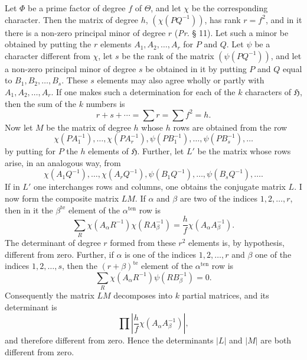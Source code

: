 \documentclass[11pt]{article}
\newcommand{\Hgrp}{\mathfrak{H}}
\newcommand{\ten}{\mathrm{ten}}
\newcommand{\te}{\mathrm{te}}
\begin{document}
Let $\Phi$ be a prime factor of degree $f$ of $\Theta$, and let $\chi$ be the corresponding character. Then the matrix of degree $h$, $(\chi(PQ^{-1}))$, has rank $r=f^2$, and in it there is a non-zero principal minor of degree $r$ (\emph{Pr.} § 11). Let such a minor be obtained by putting the $r$ elements $A_1,A_2,\ldots,A_r$ for $P$ and $Q$. Let $\psi$ be a character different from $\chi$, let $s$ be the rank of the matrix $(\psi(PQ^{-1}))$, and let a non-zero principal minor of degree $s$ be obtained in it by putting $P$ and $Q$ equal to $B_1,B_2,\ldots,B_s$. These $s$ elements may also agree wholly or partly with $A_1,A_2,\ldots,A_r$. If one makes such a determination for each of the $k$ characters of $\Hgrp$, then the sum of the $k$ numbers is
\[
r+s+\cdots=\sum r=\sum f^2=h.
\]
Now let $M$ be the matrix of degree $h$ whose $h$ rows are obtained from the row
\[
\chi(PA_1^{-1}),\ldots,\chi(PA_r^{-1}),\psi(PB_1^{-1}),\ldots,\psi(PB_s^{-1}),\ldots
\]
by putting for $P$ the $h$ elements of $\Hgrp$. Further, let $L'$ be the matrix whose rows arise, in an analogous way, from
\[
\chi(A_1Q^{-1}),\ldots,\chi(A_rQ^{-1}),\psi(B_1Q^{-1}),\ldots,\psi(B_sQ^{-1}),\ldots.
\]
If in $L'$ one interchanges rows and columns, one obtains the conjugate matrix $L$. I now form the composite matrix $LM$. If $\alpha$ and $\beta$ are two of the indices $1,2,\ldots,r$, then in it the $\beta^{\te}$ element of the $\alpha^{\ten}$ row is
\[
\sum_R\chi(A_\alpha R^{-1})\chi(RA_\beta^{-1})=\frac{h}{f}\chi(A_\alpha A_\beta^{-1}).
\]
The determinant of degree $r$ formed from these $r^2$ elements is, by hypothesis, different from zero. Further, if $\alpha$ is one of the indices $1,2,\ldots,r$ and $\beta$ one of the indices $1,2,\ldots,s$, then the $(r+\beta)^{\te}$ element of the $\alpha^{\ten}$ row is
\[
\sum_R\chi(A_\alpha R^{-1})\psi(RB_\beta^{-1})=0.
\]
Consequently the matrix $LM$ decomposes into $k$ partial matrices, and its determinant is
\[
\prod\left|\frac{h}{f}\chi(A_\alpha A_\beta^{-1})\right|,
\]
and therefore different from zero. Hence the determinants $|L|$ and $|M|$ are both different from zero.
\end{document}
